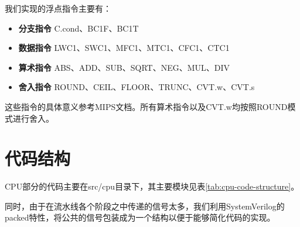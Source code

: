 我们实现的浮点指令主要有：
\begin{itemize}
	\item \textbf{分支指令} C.cond、BC1F、BC1T
	\item \textbf{数据指令} LWC1、SWC1、MFC1、MTC1、CFC1、CTC1
	\item \textbf{算术指令} ABS、ADD、SUB、SQRT、NEG、MUL、DIV
	\item \textbf{舍入指令} ROUND、CEIL、FLOOR、TRUNC、CVT.w、CVT.s
\end{itemize}

	这些指令的具体意义参考MIPS文档。所有算术指令以及CVT.w均按照ROUND模式进行舍入。
\section{代码结构}
CPU部分的代码主要在src/cpu目录下，其主要模块见表\ref{tab:cpu-code-structure}。

同时，由于在流水线各个阶段之中传递的信号太多，我们利用SystemVerilog的packed特性，将公共的信号包装成为一个结构以便于能够简化代码的实现。

